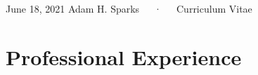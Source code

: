 \documentclass[11pt, a4paper]{awesome-cv}
\begin{document}
\makecvheader

\makecvfooter
  {June 18, 2021}
    {Adam H. Sparks~~~·~~~Curriculum Vitae}
  {\thepage}





\hypertarget{professional-experience}{%
\section{Professional Experience}\label{professional-experience}}
\end{document}
